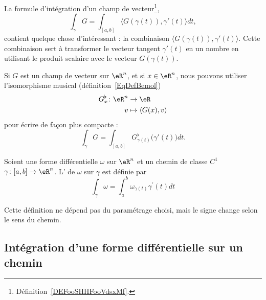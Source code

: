 La formule d'intégration d'un champ de vecteur\footnote{Définition~\ref{DEFooSHHFooVdsxMf}.},
\begin{equation}
	\int_{\gamma}G=\int_{[a,b]}\langle G (\gamma(t)), \gamma'(t)\rangle dt,
\end{equation}
contient quelque chose d'intéressant : la combinaison \( \langle G( \gamma(t) ), \gamma'(t)\rangle\). Cette combinaison sert à transformer le vecteur tangent \( \gamma'(t)\) en un nombre en utilisant le produit scalaire avec le vecteur \( G( \gamma(t) )\).

Si \( G\) est un champ de vecteur sur \( \eR^n\), et si \( x\in\eR^n\), nous pouvons utiliser l'isomorphisme musical (définition~\ref{EqDefBemol})
\begin{equation}
	\begin{aligned}[]
		G^{\flat}_x\colon \eR^n & \to \eR                        \\
		v                       & \mapsto \langle G(x), v\rangle
	\end{aligned}
\end{equation}
pour écrire de façon plus compacte :
\begin{equation}
	\int_{\gamma}G=\int_{[a,b]} G^{\flat}_{\gamma(t)}\big( \gamma'(t)\big) dt.
\end{equation}

\begin{definition}      \label{DEFooRMHGooFtMEPB}
	Soient une forme différentielle \( \omega\) sur \( \eR^n\) et un chemin de classe \( C^1\) \( \gamma\colon \mathopen[ a , b \mathclose]\to \eR^n\). L' de \( \omega\) sur \( \gamma\) est définie par
	\begin{equation}    \label{EqEFIZyEe}
		\int_\gamma \omega = \int_a^b \omega_{\gamma(t)}\gamma^\prime(t) d t
	\end{equation}
\end{definition}

\begin{remark}
	Cette définition ne dépend pas du paramétrage choisi, mais le signe change selon le sens du chemin.
\end{remark}

\subsection{Intégration d'une forme différentielle sur un chemin}

